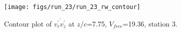 \begin{figure}[H]
\centering
\texttt{[image: figs/run\_23/run\_23\_rw\_contour]}
\caption{Contour plot of $\overline{v_{r}^{\prime} v_{z}^{\prime}}$ at $z/c$=7.75, $V_{free}$=19.36, station 3.}
\label{fig:run_23_rw_contour}
\end{figure}


